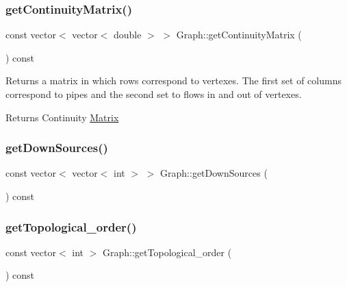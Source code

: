 \subsubsection{\texorpdfstring{get\+Continuity\+Matrix()}{getContinuityMatrix()}}
{\footnotesize\ttfamily const vector$<$ vector$<$ double $>$ $>$ Graph\+::get\+Continuity\+Matrix (\begin{DoxyParamCaption}{ }\end{DoxyParamCaption}) const}

Returns a matrix in which rows correspond to vertexes. The first set of columns correspond to pipes and the second set to flows in and out of vertexes. \begin{DoxyReturn}{Returns}
Continuity \mbox{\hyperlink{classMatrix}{Matrix}} 
\end{DoxyReturn}
\mbox{\label{classGraph_a9bbef60829d62f08e802dd1fbda0e4b7}} 
\subsubsection{\texorpdfstring{get\+Down\+Sources()}{getDownSources()}}
{\footnotesize\ttfamily const vector$<$ vector$<$ int $>$ $>$ Graph\+::get\+Down\+Sources (\begin{DoxyParamCaption}{ }\end{DoxyParamCaption}) const}

\mbox{\label{classGraph_a4d531e9313e31e92b9e816bdb5a9d14f}} 
\subsubsection{\texorpdfstring{get\+Topological\+\_\+order()}{getTopological\_order()}}
{\footnotesize\ttfamily const vector$<$ int $>$ Graph\+::get\+Topological\+\_\+order (\begin{DoxyParamCaption}{ }\end{DoxyParamCaption}) const}

\mbox{\label{classGraph_a0d4d0149e7d70bb9e6b7a5cae22062a3}} 
